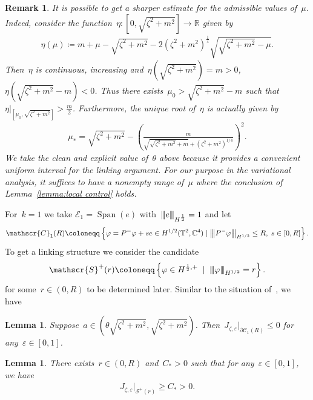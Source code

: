 \documentclass[11pt,final]{amsart}
\newcommand{\tnorm}[1]{%
  \left\vert\kern-0.3ex\left\vert\kern-0.3ex\left\vert #1 \right\vert\kern-0.3ex\right\vert\kern-0.3ex\right\vert
}
\newcommand{\p}{\partial}
\newcommand{\R}{\mathbb{R}}
\newcommand{\C}{\mathbb{C}}
\newcommand{\T}{\mathbb{T}}
\newcommand{\eps}{\varepsilon}
\newcommand{\parenthesis}[1]{\left(#1\right)} %
\newcommand{\braces}[1]{\left\{#1\right\}} %
\DeclareMathOperator{\Span}{Span}
\newtheorem{lemma}[thm]{Lemma}
\newtheorem{rmk}[thm]{Remark}
\begin{document}
\begin{rmk}
    It is possible to get a sharper estimate for the admissible values of~$\mu$.
    Indeed, consider the function~$\eta\colon [0,\sqrt{\zeta^2+m^2}]\to\R$ given by
    \begin{align}
    \eta(\mu)\coloneqq m+\mu-\sqrt{\zeta^2+m^2} -2(\zeta^2+m^2)^{\frac{1}{4}}\sqrt{\sqrt{ \zeta^2+m^2 }  -\mu}.
    \end{align}
    Then~$\eta$ is continuous, increasing and~$\eta(\sqrt{\zeta^2+m^2})=m>0$,~$\eta(\sqrt{\zeta^2+m^2}-m)<0$.
    Thus there exists~$\mu_0> \sqrt{\zeta^2+m^2}-m $ such that~$\eta|_{[\mu_0,\sqrt{\zeta^2+m^2}]}>\frac{m}{2}$.
    Furthermore, the unique root of~$\eta$ is actually given by
    \begin{align}
        \mu_*=\sqrt{\zeta^2+m^2}-\parenthesis{\frac{m}{\sqrt{\sqrt{\zeta^2+m^2}+m}+ (\zeta^2+m^2)^{1/4} } }^2.
    \end{align}
    We take the clean and explicit value of~$\theta$ above because it provides a convenient uniform interval for the linking argument.
    For our purpose in the variational analysis, it suffices to have a nonempty range of~$\mu$ where the conclusion of Lemma~\ref{lemma:local control} holds. 
    

    
\end{rmk}


For~$k=1$ we take $\mathscr{E}_1=\Span(e)$ with~$\tnorm{e}_{H^{\frac{1}{2}}}=1$ and let
\begin{align}
    \mathscr{C}_1(R)
    \coloneqq \braces{\varphi= P^-\varphi + s e\in H^{1/2}(\T^2,\C^4) \mid  \tnorm{P^-\varphi}_{H^{1/2}}\leq R, \; s \in [0, R]}.
\end{align}
To get a linking structure we consider the candidate
\begin{align}
    \mathscr{S}^+(r)\coloneqq \braces{\varphi\in H^{\frac{1}{2},+} \; \mid \; \tnorm{\varphi}_{H^{1/2}}=r }.
\end{align}
for some~$r\in(0,R)$ to be determined later.
Similar to the situation of~\cite{WZ2026Stationary}, we have
\begin{lemma}\label{lemma:negativity on boundary-1}
    Suppose~$a \in (\theta\sqrt{\zeta^2+m^2},\sqrt{\zeta^2+m^2})$. 
    Then~$J_{\zeta,\eps}|_{\p\mathscr{C}_1(R)}\leq 0$ for any~$\eps\in [0,1]$.
\end{lemma}
\begin{lemma}\label{lemma:positivity in interior-1}
    There exists~$r\in (0,R)$ and~$C_*>0$ such that for any~$\eps\in [0,1]$, we have
    \begin{align}
         J_{\zeta,\eps}|_{\mathscr{S}^+(r)}\geq C_*>0.
    \end{align}
\end{lemma}
\end{document}
